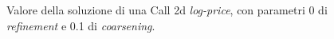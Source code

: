 \documentclass[a4paper,10pt]{report}
\theoremstyle{plain}
\theoremstyle{definition}
\theoremstyle{remark}
\begin{document}
\begin{figure}[htp!]
\begin{center}
\caption{Valore della soluzione di una Call 2d \emph{log-price}, con parametri 0 di \emph{refinement} e 0.1 di \emph{coarsening}.}
\label{fig:test5-2}
\end{center}
\end{figure}
\end{document}

